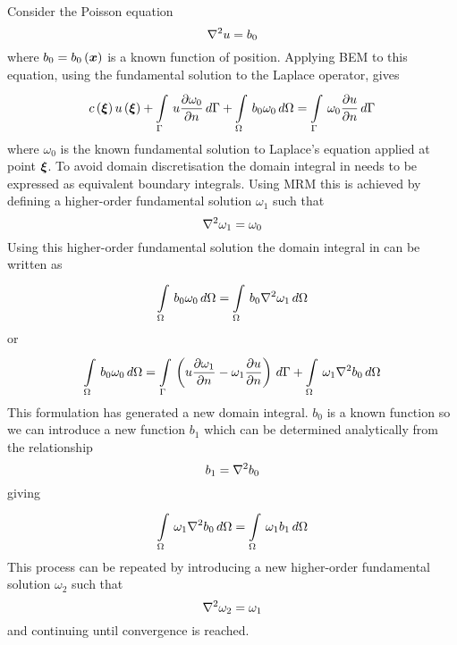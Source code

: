   Consider the Poisson equation
\begin{equation}
  \nabla^{2} {u} = b_{0}
\end{equation}
where $b_{0} = \fnof{b_{0}}{\vect{x}}$ is a known function of position.
Applying BEM to this equation, using the fundamental solution to the Laplace
operator, gives
\begin{equation}
  \fnof{c}{\vect{\xi}} \fnof{u}{\vect{\xi}} + 
  \goneint{u \delby{\omega_{0}}{n}}{\Gamma} + 
  \goneint{b_{0} \omega_{0}}{\Omega} = \goneint{\omega_{0} \delby{u}{n}}{\Gamma}
\label{eq:mrmstart}
\end{equation}
where $\omega_{0}$ is the known fundamental solution to Laplace's equation
applied at point $\vect{\xi}$.  To avoid domain discretisation the domain integral
in  needs to be expressed as equivalent boundary
integrals.  Using MRM this is achieved by defining a higher-order
fundamental solution $\omega_{1}$ such that
\begin{equation}
  \nabla^{2} {\omega_{1}} = \omega_{0}
\end{equation}
Using this higher-order fundamental solution the domain integral in
 can be written as
\begin{equation}
     \displaystyle\int\limits_{\Omega}^{} \,b_{0} \omega_{0}\,d\Omega   =
     \displaystyle\int\limits_{\Omega}^{} \,b_{0}\nabla^{2} {\omega_{1}}\,d\Omega   
\end{equation}
or 
\begin{equation}
     \displaystyle\int\limits_{\Omega}^{} \,b_{0} \omega_{0}\,d\Omega   = 
     \displaystyle\int\limits_{\Gamma}^{} \,\left( u  \dfrac{\partial \omega_{1}}{\partial n}  - \omega_{1}  \dfrac{\partial u}{\partial n}  \right)\,d\Gamma   +
     \displaystyle\int\limits_{\Omega}^{} \,\omega_{1} \nabla^{2} {b_{0}}\,d\Omega  
\label{eq:delb}
\end{equation}
This formulation has generated a new domain integral.  $b_{0}$ is a known
function so we can introduce a new function $b_{1}$ which can be determined
analytically from the relationship
\begin{equation}
  b_{1} = \nabla^{2} {b_{0}}
\end{equation}
giving 
\begin{equation}
     \displaystyle\int\limits_{\Omega}^{} \,\omega_{1} \nabla^{2} {b_{0}}\,d\Omega   = 
     \displaystyle\int\limits_{\Omega}^{} \,\omega_{1} b_{1}\,d\Omega  
\end{equation}
This process can be repeated by introducing a new higher-order fundamental
solution $\omega_{2}$ such that
\begin{equation}
  \nabla^{2} {\omega_{2}} = \omega_{1}
\end{equation}
and continuing until convergence is reached.

